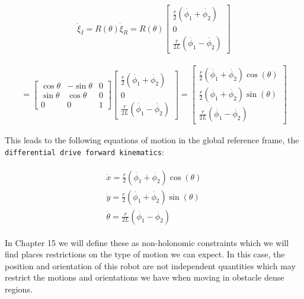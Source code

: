 \[\begin{aligned}
\dot{\xi}_I = R(\theta) \dot{\xi}_R = R(\theta) \begin{bmatrix} \frac{r}{2}
(\dot{\phi_1}+\dot{\phi_2})\\
0 \\ \frac{r}{2L} (\dot{\phi_1}-\dot{\phi_2})\end{bmatrix}
\end{aligned}\]

\[\begin{aligned}
= \begin{bmatrix} \cos \theta & -\sin \theta & 0 \\ \sin \theta & \cos \theta
& 0 \\
                   0 & 0 & 1
              \end{bmatrix} \begin{bmatrix} \frac{r}{2}
(\dot{\phi_1}+\dot{\phi_2})\\
0 \\ \frac{r}{2L} (\dot{\phi_1}-\dot{\phi_2})\end{bmatrix}
= \begin{bmatrix} \frac{r}{2} (\dot{\phi_1}+\dot{\phi_2})\cos(\theta) \\
\frac{r}{2} (\dot{\phi_1}+\dot{\phi_2})\sin(\theta)\\
   \frac{r}{2L} (\dot{\phi_1}-\dot{\phi_2})
  \end{bmatrix}
\end{aligned}\]

This leads to the following equations of motion in the global reference
frame, the \texttt{differential\ drive\ forward\ kinematics}:

\[\begin{aligned}
\boxed{
\begin{array}{l}
\dot{x} = \frac{r}{2} (\dot{\phi_1}+\dot{\phi_2})\cos(\theta) \\[4mm]
\dot{y} = \frac{r}{2} (\dot{\phi_1}+\dot{\phi_2})\sin(\theta) \\[4mm]
\dot{\theta} = \frac{r}{2L} (\dot{\phi_1}-\dot{\phi_2})
\end{array}}
\end{aligned}\]

In Chapter 15 we will define these as non-holonomic constraints which we
will find places restrictions on the type of motion we can expect. In
this case, the position and orientation of this robot are not
independent quantities which may restrict the motions and orientations
we have when moving in obstacle dense regions.

